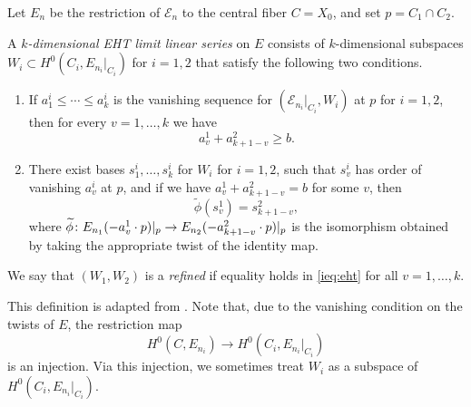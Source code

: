 Let $E_n$ be the restriction of $\mathcal E_n$ to the central fiber $C = X_0$, and set $p = C_1 \cap C_2$.
\begin{definition}
  \label{def:eht}
  A \emph{$k$-dimensional EHT limit linear series} on $E$ consists of $k$-dimensional subspaces $W_i \subset H^0(C_i, E_{n_i}|_{C_i})$ for $i = 1, 2$ that satisfy the following two conditions.
  \begin{enumerate}
  \item
    \label{ieq:eht}
    If $a^i_1 \leq \cdots \leq a^i_k$ is the vanishing sequence for $(\mathcal E_{n_i}|_{C_i}, W_i)$ at $p$ for $i = 1, 2$, then for every $v = 1, \dots, k$ we have
    \[ a^1_v + a^2_{k+1-v} \geq b.\]
  \item\label{gluing:eht}
    There exist bases $s^i_1, \dots, s^i_k$ for $W_i$ for $i = 1, 2$, such that $s^i_v$ has order of vanishing $a^i_v$ at $p$, and if we have $a^1_v + a^2_{k+1-v} = b$ for some $v$, then
    \[ \widetilde \phi (s^1_v) = s^2_{k+1-v},\]
    where $\widetilde \phi {\colon} E_{n_1}(-a^1_{v}\cdot p)|_p \to E_{n_2}(-a^2_{k+1-v} \cdot p) |_p$ is the isomorphism obtained by taking the appropriate twist of the identity map.
  \end{enumerate}
  We say that $(W_1, W_2)$ is a \emph{refined} if equality holds in \eqref{ieq:eht} for all $v = 1, \dots, k$.
\end{definition}
This definition is adapted from \cite[Definition~4.1.2]{oss:14}.
Note that, due to the vanishing condition on the twists of $E$, the restriction map
\[ H^0(C, E_{n_i}) \to H^0(C_i, E_{n_i}|_{C_i})\]
is an injection.
Via this injection, we sometimes treat $W_i$ as a subspace of $H^0(C_i, E_{n_i}|_{C_i})$.

